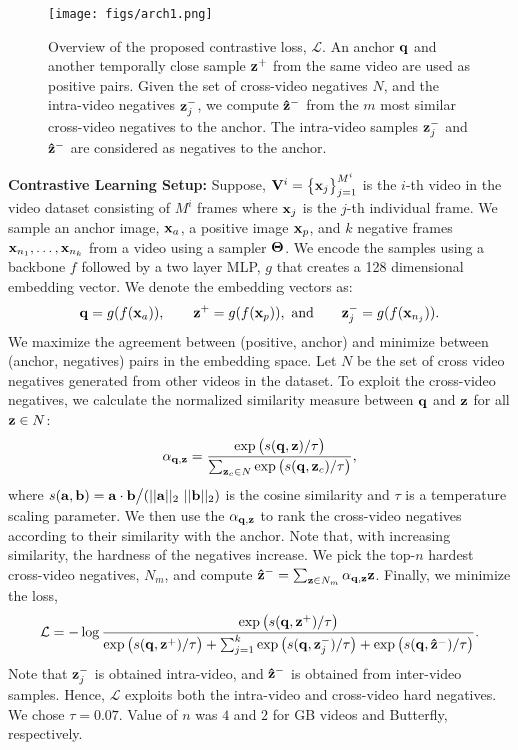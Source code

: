 \documentclass[runningheads]{llncs}
\newcommand{\myfirstpara}[1]{\par \noindent \textbf{#1:}}
\begin{document}
\begin{figure}[t]
    \centering
    \texttt{[image: figs/arch1.png]}
    \caption{Overview of the proposed contrastive loss, $\mathcal{L}$. An anchor $\vb{q}$ and another temporally close sample $\vb{z}^+$ from the same video are used as positive pairs. Given the set of cross-video negatives $N$, and the intra-video negatives $\vb{z}_j^-$, we compute $\vb{\hat{z}}^-$ from the $m$ most similar cross-video negatives to the anchor. The intra-video samples $\vb{z}_j^-$ and $\vb{\hat{z}}^-$ are considered as negatives to the anchor.}
    \label{fig:my_label}
\end{figure}

\myfirstpara{Contrastive Learning Setup}
%
Suppose, $\vb{V}^i = \big\{ \vb{x}_j\big\}_{j=1}^{M^i}$ is the $i$-th video in the video dataset consisting of $M^i$ frames where $\vb{x}_j$ is the $j$-th individual frame. We sample an anchor image, $\vb{x}_a$, a positive image $\vb{x}_p$, and $k$ negative frames $\vb{x}_{n_1}, \ldots, \vb{x}_{n_k}$ from a video using a sampler $\vb{\Theta}$. We encode the samples using a backbone $f$ followed by a two layer MLP, $g$ that creates a 128 dimensional embedding vector. We denote the embedding vectors as:
%
\begin{align}
    \vb{q} = g(f(\vb{x}_a)), \qquad
    \vb{z}^+ = g(f(\vb{x}_p)), ~ \text{and} \qquad
    \vb{z}_j^- = g(f(\vb{x}_{n_j})).
\end{align}
%
We maximize the agreement between (positive, anchor) and minimize between (anchor, negatives) pairs in the embedding space. Let $N$ be the set of cross video negatives generated from other videos in the dataset. To exploit the cross-video negatives, we calculate the normalized similarity measure between $\vb{q}$ and $\vb{z}$ for all $\vb{z} \in N$:
%
\begin{align}
    \alpha_{\vb{q},\vb{z}}= \frac{\exp\big(s(\vb{q}, \vb{z})/\tau\big)}{ \sum_{\vb{z}_c\in N}\exp\big(s(\vb{q}, \vb{z}_c)/\tau\big)},
\end{align}
%
where $s(\vb{a}, \vb{b}) = \vb{a}\cdot \vb{b}\big/(||\vb{a}||_2~ ||\vb{b}||_2)$ is the cosine similarity and $\tau$ is a temperature scaling parameter.
We then use the $\alpha_{\vb{q},\vb{z}}$ to rank the cross-video negatives according to their similarity with the anchor. Note that, with increasing similarity, the hardness of the negatives increase. We pick the top-$n$ hardest cross-video negatives, $N_m$, and compute $\vb{\hat{z}}^- = \sum_{\vb{z}\in N_m}{\alpha_{\vb{q},\vb{z}} \vb{z}}$. 
Finally, we minimize the loss,
%
\begin{align}
    \mathcal{L} = -\log \frac{\exp\big(s(\vb{q}, \vb{z}^+)/\tau\big)}{\exp\big(s(\vb{q}, \vb{z}^+)/\tau\big) + \sum_{j=1}^k\exp\big(s(\vb{q}, \vb{z}_j^-)/\tau\big) + \exp\big(s(\vb{q}, \vb{\hat{z}}^-)/\tau\big)}.
\label{eqn:loss_term}
\end{align}
%
Note that $\vb{z}_j^-$ is obtained intra-video, and $\vb{\hat{z}}^-$ is obtained from inter-video samples. Hence, $\mathcal{L}$ exploits both the intra-video and cross-video hard negatives. We chose $\tau\!=\!0.07$. Value of $n$ was $4$ and $2$ for GB videos and Butterfly, respectively.
\end{document}
